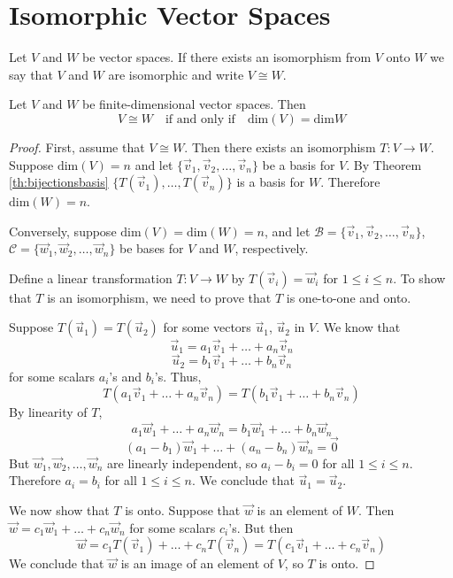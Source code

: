 \documentclass{ximera}
\begin{document}
 
\section{Isomorphic Vector Spaces}
\begin{definition} Let $V$ and $W$ be vector spaces.  If there exists an isomorphism from $V$ onto $W$ we say that $V$ and $W$ are isomorphic and write $V\cong W$.
\end{definition}

\begin{theorem}\label{th:ndimspacesisorn}
Let $V$ and $W$ be finite-dimensional vector spaces. Then
$$V\cong W\quad\text{if and only if}\quad \text{dim}(V)=\text{dim}W$$
\end{theorem}
\begin{proof}
First, assume that $V\cong W$.  Then there exists an isomorphism $T:V\rightarrow W$.  Suppose $\text{dim}(V)=n$ and let $\{\vec{v}_1,\vec{v}_2,\ldots ,\vec{v}_n\}$ be a basis for $V$. By Theorem \ref{th:bijectionsbasis} $\{T(\vec{v}_1),\ldots ,T(\vec{v}_n)\}$ is a basis for $W$. Therefore $\text{dim}(W)=n$.

Conversely, suppose $\text{dim}(V)=\text{dim}(W)=n$, and let $\mathcal{B}=\{\vec{v}_1,\vec{v}_2,\ldots ,\vec{v}_n\}$, $\mathcal{C}=\{\vec{w}_1,\vec{w}_2,\ldots ,\vec{w}_n\}$ be bases for $V$ and $W$, respectively.

Define a linear transformation $T:V\rightarrow W$ by $T(\vec{v}_i)=\vec{w}_i$ for $1\leq i\leq n$.  To show that $T$ is an isomorphism, we need to prove that $T$ is one-to-one and onto.

Suppose $T(\vec{u}_1)=T(\vec{u}_2)$ for some vectors $\vec{u}_1$, $\vec{u}_2$ in $V$.  We know that
$$\vec{u}_1=a_1\vec{v}_1+\ldots +a_n\vec{v}_n$$
$$\vec{u}_2=b_1\vec{v}_1+\ldots +b_n\vec{v}_n$$
for some scalars $a_i$'s and $b_i$'s.  Thus,
$$T(a_1\vec{v}_1+\ldots +a_n\vec{v}_n)=T(b_1\vec{v}_1+\ldots +b_n\vec{v}_n)$$
By linearity of $T$,
$$a_1\vec{w}_1+\ldots +a_n\vec{w}_n=b_1\vec{w}_1+\ldots +b_n\vec{w}_n$$
$$(a_1-b_1)\vec{w}_1+\ldots +(a_n-b_n)\vec{w}_n=\vec{0}$$
But $\vec{w}_1,\vec{w}_2,\ldots ,\vec{w}_n$ are linearly independent, so $a_i-b_i=0$ for all $1\leq i\leq n$.  Therefore $a_i=b_i$ for all $1\leq i\leq n$.  We conclude that $\vec{u}_1=\vec{u}_2$.

We now show that $T$ is onto. Suppose that $\vec{w}$ is an element of $W$.  Then $\vec{w}=c_1\vec{w}_1+\ldots +c_n\vec{w}_n$ for some scalars $c_i$'s.  But then
$$\vec{w}=c_1T(\vec{v}_1)+\ldots +c_nT(\vec{v}_n)=T(c_1\vec{v}_1+\ldots +c_n\vec{v}_n)$$
We conclude that $\vec{w}$ is an image of an element of $V$, so $T$ is onto.

\end{proof}
\end{document}

